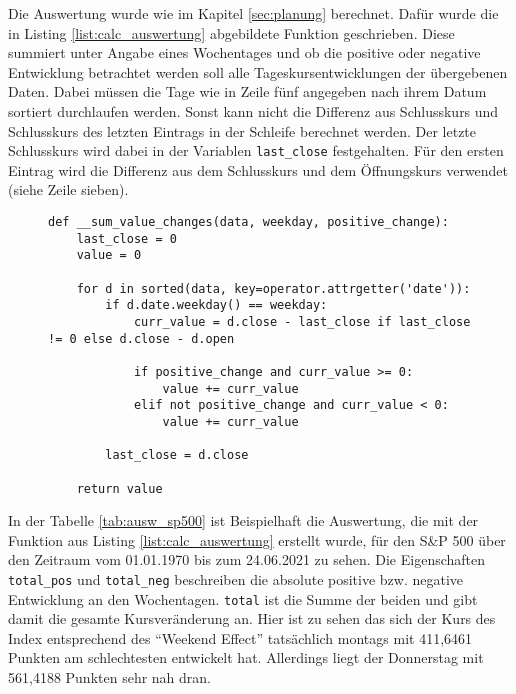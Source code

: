 Die Auswertung wurde wie im Kapitel \cref{sec:planung} berechnet. Dafür wurde die in Listing \ref{list:calc_auswertung} abgebildete Funktion geschrieben. Diese summiert unter Angabe eines Wochentages und ob die positive oder negative Entwicklung betrachtet werden soll alle Tageskursentwicklungen der übergebenen Daten. Dabei müssen die Tage wie in Zeile fünf angegeben nach ihrem Datum sortiert durchlaufen werden. Sonst kann nicht die Differenz aus Schlusskurs und Schlusskurs des letzten Eintrags in der Schleife berechnet werden. Der letzte Schlusskurs wird dabei in der Variablen \texttt{last\_close} festgehalten. Für den ersten Eintrag wird die Differenz aus dem Schlusskurs und dem Öffnungskurs verwendet (siehe Zeile sieben).

\begin{figure}[!htb]
    \begin{lstlisting}[caption=Berechnung der Kursentwicklung nach Wochentag, label=list:calc_auswertung]
def __sum_value_changes(data, weekday, positive_change):
    last_close = 0
    value = 0

    for d in sorted(data, key=operator.attrgetter('date')):
        if d.date.weekday() == weekday:
            curr_value = d.close - last_close if last_close != 0 else d.close - d.open

            if positive_change and curr_value >= 0:
                value += curr_value
            elif not positive_change and curr_value < 0:
                value += curr_value

        last_close = d.close

    return value
    \end{lstlisting}
\end{figure}

In der Tabelle \ref{tab:ausw_sp500} ist Beispielhaft die Auswertung, die mit der Funktion aus Listing \ref{list:calc_auswertung} erstellt wurde, für den S\&P 500 über den Zeitraum vom 01.01.1970 bis zum 24.06.2021 zu sehen. Die Eigenschaften \texttt{total\_pos} und \texttt{total\_neg} beschreiben die absolute positive bzw. negative Entwicklung an den Wochentagen. \texttt{total} ist die Summe der beiden und gibt damit die gesamte Kursveränderung an. Hier ist zu sehen das sich der Kurs des Index entsprechend des \enquote{Weekend Effect} tatsächlich montags mit 411,6461 Punkten am schlechtesten entwickelt hat. Allerdings liegt der Donnerstag mit 561,4188 Punkten sehr nah dran.

